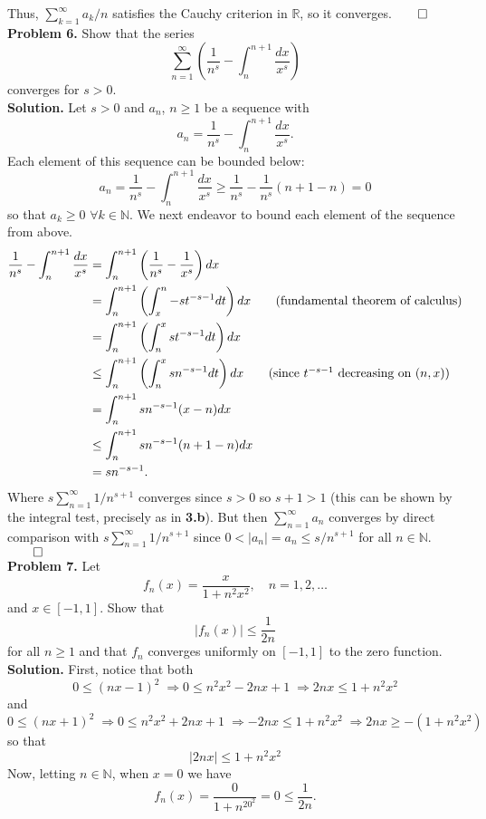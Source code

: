 \documentclass[11pt, letterpaper]{article}
\newcommand{\mbb}[1]{\mathbb{#1}}
\begin{document}
    Thus, $\sum_{k=1}^\infty a_k/n$ satisfies the Cauchy criterion in $\mbb{R}$, so it converges.\hfill{$\qed$}\\[10pt]
    {\bf Problem 6.} Show that the series
    \[\sum_{n=1}^\infty\left(\frac{1}{n^s}-\int_{n}^{n+1}\frac{dx}{x^s}\right)\]
    converges for $s>0$.\\[10pt]
    {\bf Solution.} Let $s>0$ and $a_n$, $n\geq 1$ be a sequence with
    \[a_n=\frac{1}{n^s}-\int_n^{n+1}\frac{dx}{x^s}.\]
    Each element of this sequence can be bounded below:
    \[a_n=\frac{1}{n^s}-\int_n^{n+1}\frac{dx}{x^s}\geq\frac{1}{n^s}-\frac{1}{n^s}(n+1-n)=0\]
    so that $a_k\geq 0$ $\forall k\in\mbb{N}$. We next endeavor to bound each element of the sequence from above.
    \begin{align*}
        \frac{1}{n^s}-\int_{n}^{n+1}\frac{dx}{x^s}&=\int_{n}^{n+1}\left(\frac{1}{n^s}-\frac{1}{x^s}\right)dx\\
        &=\int_{n}^{n+1}\left(\int_{x}^n-st^{-s-1}dt\right)dx\tag{fundamental theorem of calculus}\\
        &=\int_n^{n+1}\left(\int_{n}^xst^{-s-1}dt\right)dx\\
        &\leq \int_n^{n+1}\left(\int_n^xsn^{-s-1}dt\right)dx\tag{since $t^{-s-1}$ decreasing on $(n,x)$}\\
        &=\int_n^{n+1}sn^{-s-1}(x-n)dx\\
        &\leq \int_n^{n+1}sn^{-s-1}(n+1-n)dx\\
        &=sn^{-s-1}.
    \end{align*}
    Where $s\sum_{n=1}^\infty1/n^{s+1}$ converges since $s>0$ so $s+1>1$ (this can be shown by the integral test, precisely as in {\bf 3.b}). But then
    $\sum_{n=1}^\infty a_n$ converges by direct comparison with $s\sum_{n=1}^{\infty}1/n^{s+1}$ since $0<|a_n|=a_n\leq s/n^{s+1}$ for all $n\in\mbb{N}$.\hfill{$\qed$}\\[10pt]
    {\bf Problem 7.} Let 
    \[f_n(x)=\frac{x}{1+n^2x^2},\quad n=1,2,\dots\]
    and $x\in[-1,1]$. Show that
    \[|f_n(x)|\leq \frac{1}{2n}\]
    for all $n\geq 1$ and that $f_n$ converges uniformly on $[-1,1]$ to the zero function.\\[10pt]
    {\bf Solution.} First, notice that both
    \[0\leq (nx-1)^2\;\Rightarrow 0\leq n^2x^2-2nx+1\;\Rightarrow 2nx\leq 1+n^2x^2\]
    and
    \[0\leq (nx+1)^2\;\Rightarrow 0\leq n^2x^2+2nx+1\;\Rightarrow -2nx\leq 1+n^2x^2\;\Rightarrow 2nx\geq -(1+n^2x^2)\]
    so that
    \[|2nx|\leq 1+n^2x^2\tag{4}\]
    Now, letting $n\in\mbb{N}$, when $x=0$ we have
    \[f_n(x)=\frac{0}{1+n^20^2}=0\leq \frac{1}{2n}.\]
\end{document}
